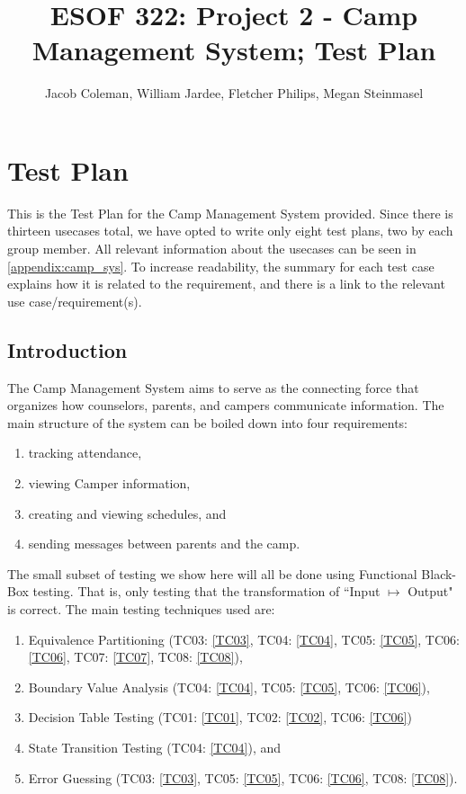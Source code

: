 \documentclass[11pt]{article}
\begin{document}
\title{ESOF 322: Project 2 - Camp Management System; Test Plan}
\author{Jacob Coleman, William Jardee, Fletcher Philips, Megan Steinmasel}
\maketitle




\section*{Test Plan}

This is the Test Plan for the Camp Management System provided. Since there is thirteen usecases total, we have opted to write only eight test plans, two by each group member. All relevant information about the usecases can be seen in \cref{appendix:camp_sys}. To increase readability, the summary for each test case explains how it is related to the requirement, and there is a link to the relevant use case/requirement(s).

\subsection*{Introduction}
The Camp Management System aims to serve as the connecting force that organizes how counselors, parents, and campers communicate information. The main structure of the system can be boiled down into four requirements:
\begin{enumerate}
	\item tracking attendance,
	\item viewing Camper information,
	\item creating and viewing schedules, and
	\item sending messages between parents and the camp.
\end{enumerate}
The small subset of testing we show here will all be done using Functional Black-Box testing. That is, only testing that the transformation of ``Input $\mapsto$ Output" is correct. The main testing techniques used are:
\begin{enumerate}
	\item Equivalence Partitioning (TC03: \cref{TC03}, TC04: \cref{TC04}, TC05: \cref{TC05}, TC06: \cref{TC06}, TC07: \cref{TC07}, TC08: \cref{TC08}),
	\item Boundary Value Analysis (TC04: \cref{TC04}, TC05: \cref{TC05}, TC06: \cref{TC06}),
	\item Decision Table Testing (TC01: \cref{TC01}, TC02: \cref{TC02}, TC06: \cref{TC06})
	\item State Transition Testing (TC04: \cref{TC04}), and
	\item Error Guessing  (TC03: \cref{TC03}, TC05: \cref{TC05}, TC06: \cref{TC06}, TC08: \cref{TC08}).
\end{enumerate}
\end{document}
